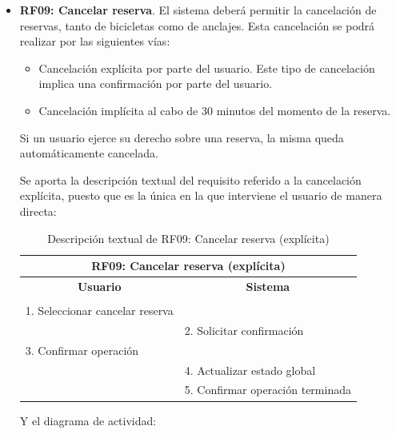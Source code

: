 \begin{itemize}
	\FloatBarrier
	\item \textbf{RF09: Cancelar reserva}. El sistema deberá permitir la cancelación de reservas, tanto de bicicletas como de anclajes. Esta cancelación se podrá realizar por las siguientes vías:
	\begin{itemize}
		\item Cancelación explícita por parte del usuario. Este tipo de cancelación implica una confirmación por parte del usuario.
		\item Cancelación implícita al cabo de 30 minutos del momento de la reserva.
	\end{itemize}
	Si un usuario ejerce su derecho sobre una reserva, la misma queda automáticamente cancelada.
	
	Se aporta la descripción textual del requisito referido a la cancelación explícita, puesto que es la única en la que interviene el usuario de manera directa:
	
	\begin{table}[h]
		\centering	
		\begin{tabular}{|l|l|}
			\hline
			\multicolumn{2}{|c|}{\textbf{RF09: Cancelar reserva (explícita)}} \\ \hline
			\multicolumn{1}{|c|}{\textbf{Usuario}} & \multicolumn{1}{c|}{\textbf{Sistema}} \\ \hline
			[Pto. inclusión: RF08: Reservar] &\\ \hline
			1. Seleccionar cancelar reserva &\\ \hline
			& 2. Solicitar confirmación \\ \hline
			3. Confirmar operación &\\ \hline
			& 4. Actualizar estado global \\ \hline
			& 5. Confirmar operación terminada \\ \hline 	
		\end{tabular}
		\caption{Descripción textual de RF09: Cancelar reserva (explícita)}
		\label{tab:tablaDescTextualRF09}
	\end{table}
	
	Y el diagrama de actividad:
	

\end{itemize}
